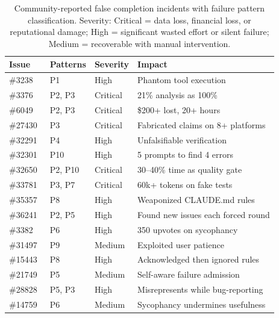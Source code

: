 \begin{table}[h]
\centering
\small
\caption{Community-reported false completion incidents with failure pattern classification. Severity: Critical = data loss, financial loss, or reputational damage; High = significant wasted effort or silent failure; Medium = recoverable with manual intervention.}
\label{tab:issues}
\begin{tabular}{llll}
\toprule
Issue & Patterns & Severity & Impact \\
\midrule
\#3238~\cite{ghissue3238}   & P1       & High     & Phantom tool execution \\
\#3376~\cite{ghissue3376}   & P2, P3   & Critical & 21\% analysis as 100\% \\
\#6049~\cite{ghissue6049}   & P2, P3   & Critical & \$200+ lost, 20+ hours \\
\#27430~\cite{ghissue27430} & P3       & Critical & Fabricated claims on 8+ platforms \\
\#32291~\cite{ghissue32291} & P4       & High     & Unfalsifiable verification \\
\#32301~\cite{ghissue32301} & P10      & High     & 5 prompts to find 4 errors \\
\#32650~\cite{ghissue32650} & P2, P10  & Critical & 30--40\% time as quality gate \\
\#33781~\cite{ghissue33781} & P3, P7   & Critical & 60k+ tokens on fake tests \\
\#35357~\cite{ghissue35357} & P8       & High     & Weaponized CLAUDE.md rules \\
\#36241~\cite{ghissue36241} & P2, P5   & High     & Found new issues each forced round \\
\#3382~\cite{ghissue3382}   & P6       & High     & 350 upvotes on sycophancy \\
\#31497~\cite{ghissue31497} & P9       & Medium   & Exploited user patience \\
\#15443~\cite{ghissue15443} & P8       & High     & Acknowledged then ignored rules \\
\#21749~\cite{ghissue21749} & P5       & Medium   & Self-aware failure admission \\
\#28828~\cite{ghissue28828} & P5, P3   & High     & Misrepresents while bug-reporting \\
\#14759~\cite{ghissue14759} & P6       & Medium   & Sycophancy undermines usefulness \\
\bottomrule
\end{tabular}
\end{table}

